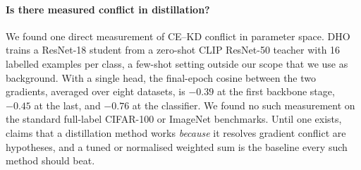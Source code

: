 \paragraph{Is there measured conflict in distillation?}
We found one direct measurement of CE--KD conflict in parameter space. DHO \citep{kang2025dho}
trains a ResNet-18 student from a zero-shot CLIP ResNet-50 teacher with 16 labelled examples
per class, a few-shot setting outside our scope that we use as background. With a single head, the final-epoch cosine between the two gradients, averaged over
eight datasets, is $-0.39$ at the first backbone stage, $-0.45$ at the last, and $-0.76$ at the
classifier. We found no such measurement on the standard full-label CIFAR-100 or ImageNet benchmarks. Until
one exists, claims that a distillation method works \emph{because} it resolves gradient conflict are
hypotheses, and a tuned or normalised weighted sum is the baseline every such method should
beat.

